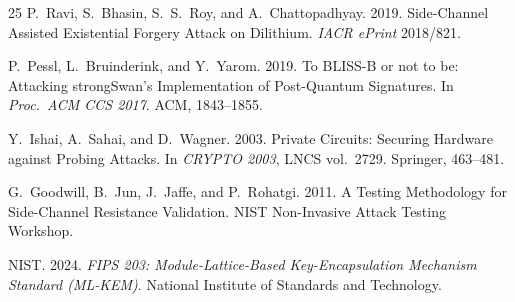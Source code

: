 \documentclass[sigconf,nonacm]{acmart}
\begin{document}
\begin{thebibliography}{25}
P.~Ravi, S.~Bhasin, S.~S.~Roy, and A.~Chattopadhyay. 2019. Side-Channel Assisted
Existential Forgery Attack on Dilithium. \textit{IACR ePrint} 2018/821.

P.~Pessl, L.~Bruinderink, and Y.~Yarom. 2019. To BLISS-B or not to be: Attacking
strongSwan's Implementation of Post-Quantum Signatures. In
\textit{Proc.\ ACM CCS 2017}. ACM, 1843--1855.

Y.~Ishai, A.~Sahai, and D.~Wagner. 2003. Private Circuits: Securing Hardware against
Probing Attacks. In \textit{CRYPTO 2003}, LNCS vol.~2729. Springer, 463--481.

G.~Goodwill, B.~Jun, J.~Jaffe, and P.~Rohatgi. 2011. A Testing Methodology for
Side-Channel Resistance Validation. NIST Non-Invasive Attack Testing Workshop.

NIST. 2024. \textit{FIPS 203: Module-Lattice-Based Key-Encapsulation Mechanism
Standard (ML-KEM)}. National Institute of Standards and Technology.

\end{thebibliography}
\end{document}

